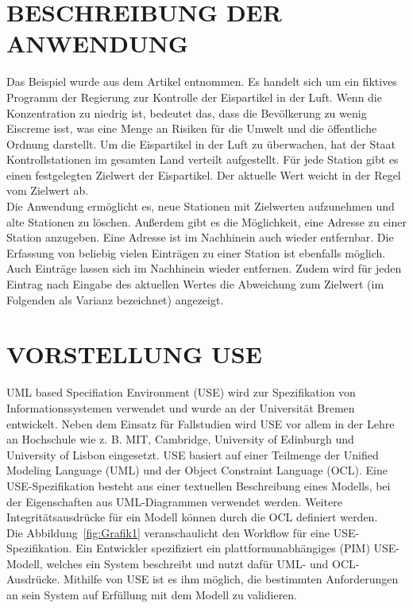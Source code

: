 \documentclass[a4paper,twoside]{article}
\begin{document}
\section{\uppercase{Beschreibung der Anwendung}}
\noindent
Das Beispiel wurde aus dem Artikel \cite{Gui06} entnommen. Es handelt sich um ein fiktives Programm der Regierung zur Kontrolle der Eispartikel in der Luft. Wenn die Konzentration zu niedrig ist, bedeutet das, dass die Bevölkerung zu wenig Eiscreme isst, was eine Menge an Risiken für die Umwelt und die öffentliche Ordnung darstellt. Um die Eispartikel in der Luft zu überwachen, hat der Staat Kontrollstationen im gesamten Land verteilt aufgestellt. Für jede Station gibt es einen festgelegten Zielwert der Eispartikel. Der aktuelle Wert weicht in der Regel vom Zielwert ab. 
\\
Die Anwendung ermöglicht es, neue Stationen mit Zielwerten aufzunehmen und alte Stationen zu löschen. Außerdem gibt es die Möglichkeit, eine Adresse zu einer Station anzugeben. Eine Adresse ist im Nachhinein auch wieder entfernbar. Die Erfassung von beliebig vielen Einträgen zu einer Station ist ebenfalls möglich. Auch Einträge lassen sich im Nachhinein wieder entfernen. Zudem wird für jeden Eintrag nach Eingabe des aktuellen Wertes die Abweichung zum Zielwert (im Folgenden als Varianz bezeichnet) angezeigt.


\section{\uppercase{Vorstellung USE}}
\noindent
UML based Specifiation Environment (USE) wird zur Spezifikation von Informationssystemen verwendet und wurde an der Universität Bremen entwickelt. Neben dem Einsatz für Fallstudien wird USE vor allem in der Lehre an Hochschule wie z. B. MIT, Cambridge, University of Edinburgh und University of Lisbon eingesetzt. USE basiert auf einer Teilmenge der Unified Modeling Language (UML) und der Object Constraint Language (OCL). Eine USE-Spezifikation besteht aus einer textuellen Beschreibung eines Modells, bei der Eigenschaften aus UML-Diagrammen verwendet werden. Weitere Integritätsausdrücke für ein Modell können durch die OCL definiert werden. \cite{Use07}
\\

Die Abbildung~\ref{fig:Grafik1} veranschaulicht den Workflow für eine USE-Spezifikation. Ein Entwickler spezifiziert ein plattformunabhängiges (PIM) USE-Modell, welches ein System beschreibt und nutzt dafür UML- und OCL-Ausdrücke. Mithilfe von USE ist es ihm möglich, die bestimmten Anforderungen an sein System auf Erfüllung mit dem Modell zu validieren.
\end{document}

